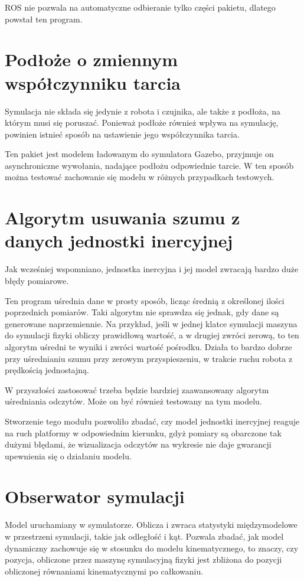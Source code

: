 	ROS nie pozwala na automatyczne odbieranie tylko części pakietu, dlatego powstał ten program.

\section{Podłoże o zmiennym współczynniku tarcia}
	\label{sec:flooria}
	Symulacja nie składa się jedynie z robota i czujnika, ale także z podłoża, na którym musi się poruszać.
	Ponieważ podłoże również wpływa na symulację, powinien istnieć sposób na ustawienie jego współczynnika tarcia.
	
	Ten pakiet jest modelem ładowanym do symulatora Gazebo, przyjmuje on asynchroniczne wywołania, nadające podłożu odpowiednie tarcie.
	W ten sposób można testować zachowanie się modelu w różnych przypadkach testowych.
	
\section{Algorytm usuwania szumu z danych jednostki inercyjnej}
	\label{sec:odszumiacz}
	Jak wcześniej wspomniano, jednostka inercyjna i jej model zwracają bardzo duże błędy pomiarowe.
	
	Ten program uśrednia dane w prosty sposób, licząc średnią z określonej ilości poprzednich pomiarów.
	Taki algorytm nie sprawdza się jednak, gdy dane są generowane naprzemiennie.
	Na przykład, jeśli w jednej klatce symulacji maszyna do symulacji fizyki obliczy prawidłową wartość, a w drugiej zwróci zerową,
	to ten algorytm uśredni te wyniki i zwróci wartość pośrodku. Działa to bardzo dobrze przy uśrednianiu 
	szumu przy zerowym przyspieszeniu, w trakcie ruchu robota z prędkością jednostajną.
	
	W przyszłości zastosować trzeba będzie bardziej zaawansowany algorytm uśredniania odczytów.
	Może on być również testowany na tym modelu.
	
	Stworzenie tego modułu pozwoliło zbadać, czy model jednostki inercyjnej reaguje na ruch platformy w odpowiednim kierunku, gdyż
	pomiary są obarczone tak dużymi błędami, że wizualizacja odczytów na wykresie nie daje gwarancji upewnienia się o działaniu modelu.
	
\section{Obserwator symulacji}
	\label{sec:ocznica}
	Model uruchamiany w symulatorze.
	Oblicza i zwraca statystyki międzymodelowe w przestrzeni symulacji, takie jak odległość i kąt.
	Pozwala zbadać, jak model dynamiczny zachowuje się w stosunku do modelu kinematycznego, to znaczy, 
	czy pozycja, obliczone przez maszynę symulacyjną fizyki jest zbliżona do pozycji obliczonej równaniami kinematycznymi po całkowaniu.
	
